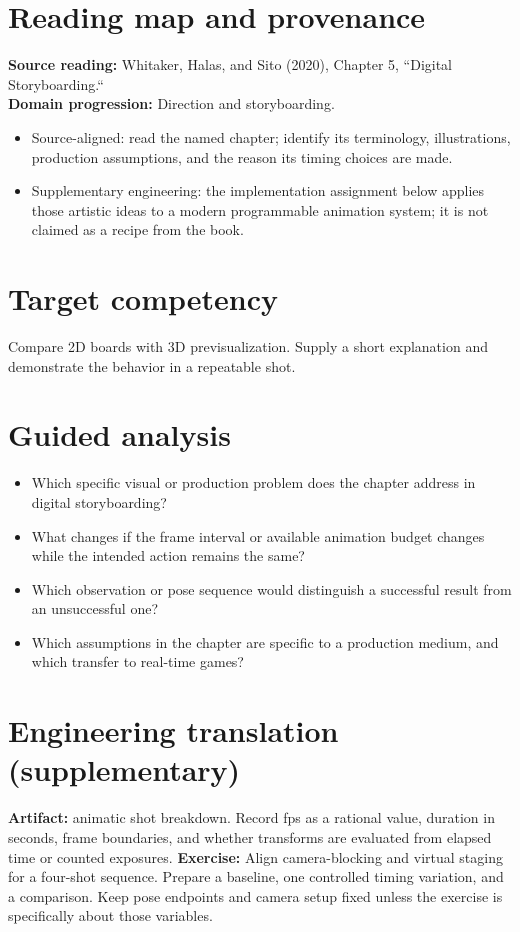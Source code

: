 \documentclass[10pt,letterpaper]{article}
\begin{document}
\makedoctitle
\makedocsummary

\section{Reading map and provenance}
\textbf{Source reading:} Whitaker, Halas, and Sito (2020), Chapter 5, ``Digital Storyboarding.``\\
\textbf{Domain progression:} Direction and storyboarding.
\begin{itemize}
\item Source-aligned: read the named chapter; identify its terminology, illustrations, production assumptions, and the reason its timing choices are made.
\item Supplementary engineering: the implementation assignment below applies those artistic ideas to a modern programmable animation system; it is not claimed as a recipe from the book.
\end{itemize}
\section{Target competency}
Compare 2D boards with 3D previsualization. Supply a short explanation and demonstrate the behavior in a repeatable shot.
\section{Guided analysis}
\begin{itemize}
\item Which specific visual or production problem does the chapter address in digital storyboarding?
\item What changes if the frame interval or available animation budget changes while the intended action remains the same?
\item Which observation or pose sequence would distinguish a successful result from an unsuccessful one?
\item Which assumptions in the chapter are specific to a production medium, and which transfer to real-time games?
\end{itemize}
\section{Engineering translation (supplementary)}
\textbf{Artifact:} animatic shot breakdown. Record fps as a rational value, duration in seconds, frame boundaries, and whether transforms are evaluated from elapsed time or counted exposures.
\textbf{Exercise:} Align camera-blocking and virtual staging for a four-shot sequence. Prepare a baseline, one controlled timing variation, and a comparison. Keep pose endpoints and camera setup fixed unless the exercise is specifically about those variables.
\end{document}
